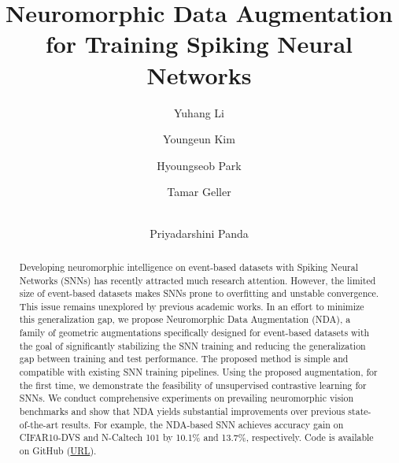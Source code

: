 \documentclass[runningheads]{llncs}
\begin{document}
\pagestyle{headings}
\mainmatter
\def\ECCVSubNumber{601}  

\makeatletter
\DeclareRobustCommand\onedot{\futurelet\@let@token\@onedot}
\def\@onedot{\ifx\@let@token.\else.\null\fi\xspace}
\def\eg{\emph{e.g}\onedot} \def\Eg{\emph{E.g}\onedot}
\def\ie{\emph{i.e}\onedot} \def\Ie{\emph{I.e}\onedot}
\def\cf{\emph{cf}\onedot} \def\Cf{\emph{Cf}\onedot}
\def\etc{\emph{etc}\onedot} \def\vs{\emph{vs}\onedot}
\def\wrt{w.r.t\onedot} \def\dof{d.o.f\onedot}
\def\iid{i.i.d\onedot} \def\wolog{w.l.o.g\onedot}
\def\etal{\emph{et al}\onedot}



\title{Neuromorphic Data Augmentation for Training Spiking Neural Networks} 



\author{Yuhang Li \and
Youngeun Kim \and
Hyoungseob Park \and Tamar Geller \and \\ Priyadarshini Panda}
\maketitle


\begin{abstract}
Developing neuromorphic intelligence on event-based datasets with Spiking Neural Networks (SNNs) has recently attracted much research attention. However, the limited size of event-based datasets makes SNNs prone to overfitting and unstable convergence. This issue remains unexplored by previous academic works.
In an effort to minimize this generalization gap, we propose Neuromorphic Data Augmentation (NDA), a family of geometric augmentations specifically designed for event-based datasets with the goal of significantly stabilizing the SNN training and reducing the generalization gap between training and test performance.
The proposed method is simple and compatible with existing SNN training pipelines. Using the proposed augmentation, for the first time, we demonstrate the feasibility of unsupervised contrastive learning for SNNs. We conduct comprehensive experiments on prevailing neuromorphic vision benchmarks and show that NDA yields substantial improvements over previous state-of-the-art results. For example, the NDA-based SNN achieves accuracy gain on CIFAR10-DVS and N-Caltech 101 by 10.1\% and 13.7\%, respectively.
Code is available on GitHub (\href{https://github.com/Intelligent-Computing-Lab-Yale/NDA_SNN}{URL}). 
\end{abstract}
\end{document}

